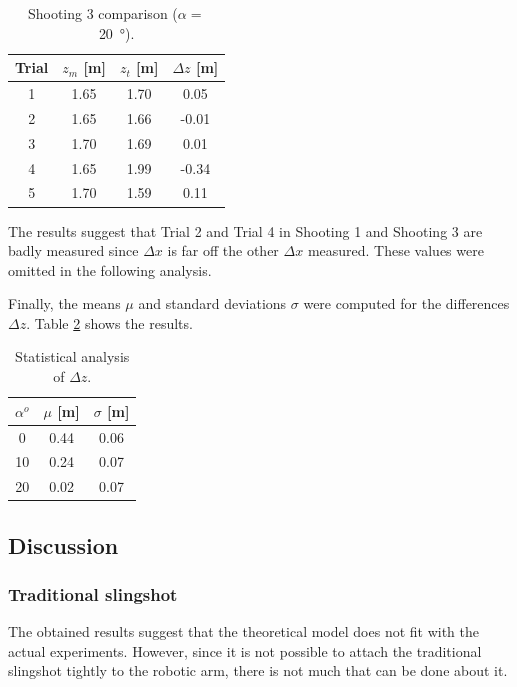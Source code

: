 			\begin{table}\centering
			\begin{tabular}{@{}cccc@{}}\toprule
			Trial & $ z_m$ [m] & $z_t$ [m] & $\Delta z$ [m] \\ \midrule

			1 & 1.65 & 1.70 & 0.05 \\
			2 & 1.65 & 1.66 & -0.01 \\
			3 & 1.70 & 1.69 & 0.01 \\
			4 & 1.65 & 1.99 & -0.34 \\
			5 & 1.70 & 1.59 & 0.11 \\
		
			\bottomrule
			\end{tabular}
			\caption{Shooting 3 comparison ($\alpha = $ \SI{20}{\degree}).}
			\label{table: exp comparison 3}
			\end{table}

			The results suggest that Trial 2 and Trial 4 in Shooting 1 and Shooting 3 are badly measured since $\Delta x$ is far off the other $\Delta x$ measured. These values were omitted in the following analysis.

			Finally, the means $\mu$ and standard deviations $\sigma$ were computed for the differences $ \Delta z$. Table \ref{table: exp analysis} shows the results.

			\begin{table}\centering
			\begin{tabular}{@{}ccc@{}}\toprule
			$\alpha^{o}$ & $\mu$ [m] & $\sigma$ [m]\\ \midrule

			0 & 0.44 & 0.06 \\
			10 & 0.24 & 0.07 \\
			20 & 0.02 & 0.07 \\
			
			\bottomrule
			\end{tabular}
			\caption{Statistical analysis of $\Delta z$.}
			\label{table: exp analysis}
			\end{table}

	\subsection{Discussion}

		\subsubsection{Traditional slingshot}
			The obtained results suggest that the theoretical model does not fit with the actual experiments. However, since it is not possible to attach the traditional slingshot tightly to the robotic arm, there is not much that can be done about it.

